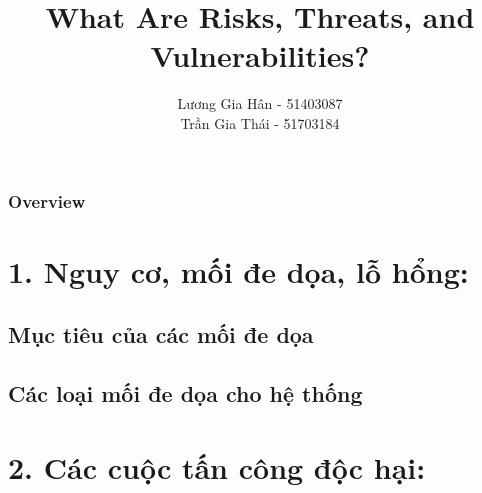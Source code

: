 \documentclass{beamer}
\title[Seminar ]{What Are Risks, Threats, and Vulnerabilities?
} %
\author{Lương Gia Hân - 51403087 \\ Trần Gia Thái - 51703184 } %
\institute[UCLA] %
{
Đại học Tôn Đức Thắng \\ %
\medskip
\textit{TPHCM} %
}
\date{} %
\begin{document}
\begin{frame}
\titlepage %
\end{frame}

\begin{frame}
\frametitle{Overview} %
\tableofcontents %
\end{frame}


\section{1.	Nguy cơ, mối đe dọa, lỗ hổng:} %

\subsection{Mục tiêu của các mối đe dọa} %
\subsection{Các loại mối đe dọa cho hệ thống} %
\section{2.	Các cuộc tấn công độc hại:} %
\end{document}
